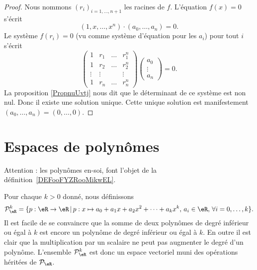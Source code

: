\begin{proof}
	Nous nommons \( (r_i)_{i=1,\ldots,n+1}\) les racines de \( f\). L'équation \( f(x)=0\) s'écrit
	\begin{equation}
		(1,x,\ldots,x^n)\cdot(a_0,\ldots,a_n)=0.
	\end{equation}
	Le système \( f(r_i)=0\) (vu comme système d'équation pour les \( a_i\)) pour tout \( i\) s'écrit
	\begin{equation}
		\begin{pmatrix}
			1      & r_1    & \ldots & r_1^n  \\
			1      & r_2    & \ldots & r_2^n  \\
			\vdots & \vdots &        & \vdots \\
			1      & r_n    & \ldots & r_n^n
		\end{pmatrix}
		\begin{pmatrix}
			a_0    \\
			\vdots \\
			a_n
		\end{pmatrix}=0.
	\end{equation}
	La proposition \ref{PropnuUvtj} nous dit que le déterminant de ce système est non nul. Donc il existe une solution unique. Cette unique solution est manifestement \( (a_0,\ldots,a_n)=(0,\ldots,0)\).
\end{proof}


\section{Espaces de polynômes}
\label{SecEspacePolynomes}

Attention : les polynômes en-soi, font l'objet de la définition~\ref{DEFooFYZRooMikwEL}.

Pour chaque \( k>0\) donné, nous définissons
\begin{equation}
	\mathcal{P}_\eR^k=\{p:\eR\to \eR\,|\, p : x\mapsto a_0+a_1 x +a_2 x^2 + \cdots+a_k x^k, \, a_i\in\eR,\,\forall i=0,\ldots,k\}.
\end{equation}
Il est facile de se convaincre que la somme de deux polynômes de degré inférieur ou égal à \( k\) est encore un polynôme de degré inférieur ou égal à \( k\). En outre il est clair que la multiplication par un scalaire ne peut pas augmenter le degré d'un polynôme. L'ensemble \( \mathcal{P}_\eR^k\) est donc un espace vectoriel muni des opérations héritées de \( \mathcal{P}_{\eR}\).

